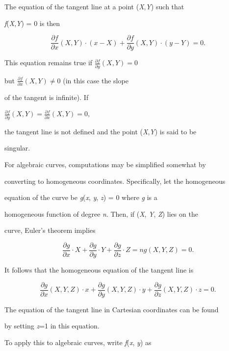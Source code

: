 {{{The equation of the tangent line at a point (\textit{X},\textit{Y}) such that

\textit{f}(\textit{X},\textit{Y}) = 0 is then



$$\frac{\partial f}{\partial x}(X,Y) \cdot (x-X)+\frac{\partial f}{\partial y}(X,Y) \cdot (y-Y)=0.$$



This equation remains true if $\frac{\partial f}{\partial y}(X,Y) = 0$

but $\frac{\partial f}{\partial x}(X,Y) \neq 0$ (in this case the slope

of the tangent is infinite). If

$\frac{\partial f}{\partial y}(X,Y) =  \frac{\partial f}{\partial x}(X,Y)  =0,$

the tangent line is not defined and the point (\textit{X},\textit{Y}) is said to be

singular.



For algebraic curves, computations may be simplified somewhat by

converting to homogeneous coordinates. Specifically, let the homogeneous

equation of the curve be \textit{g}(\textit{x}, \textit{y}, \textit{z}) = 0 where \textit{g} is a

homogeneous function of degree \textit{n}. Then, if (\textit{X}, \textit{Y}, \textit{Z}) lies on the

curve, Euler's theorem implies



$$\frac{\partial g}{\partial x} \cdot X +\frac{\partial g}{\partial y} \cdot Y+\frac{\partial g}{\partial z} \cdot Z=ng(X, Y, Z)=0.$$



It follows that the homogeneous equation of the tangent line is



$$\frac{\partial g}{\partial x}(X,Y,Z) \cdot x+\frac{\partial g}{\partial y}(X,Y,Z) \cdot y+\frac{\partial g}{\partial z}(X,Y,Z) \cdot z=0.$$



The equation of the tangent line in Cartesian coordinates can be found

by setting \textit{z}=1 in this equation.



To apply this to algebraic curves, write \textit{f}(\textit{x}, \textit{y}) as



}}}
